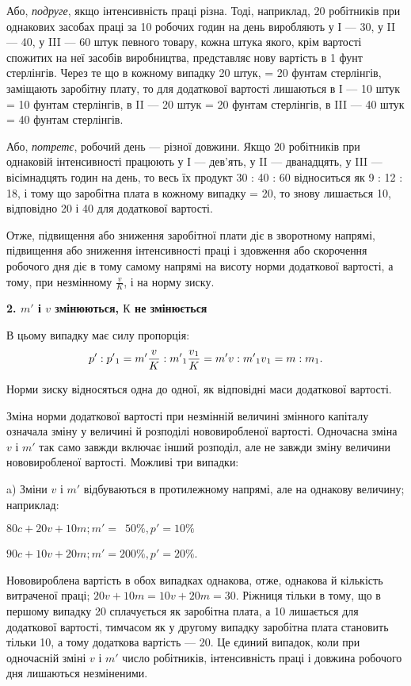 Або, \emph{подруге}, якщо інтенсивність праці різна. Тоді, наприклад,
20 робітників при однакових засобах праці за 10 робочих
годин на день виробляють у І — 30, у II — 40, у III — 60 штук
певного товару, кожна штука якого, крім вартості спожитих
на неї засобів виробництва, представляє нову вартість в 1 фунт
стерлінгів. Через те що в кожному випадку 20 штук, = 20
фунтам стерлінгів, заміщають заробітну плату, то для додаткової
вартості лишаються в І — 10 штук = 10 фунтам стерлінгів,
в II — 20 штук = 20 фунтам стерлінгів, в III — 40 штук = 40 фунтам
стерлінгів.

Або, \emph{потретє}, робочий день — різної довжини. Якщо 20 робітників
при однаковій інтенсивності працюють у І — дев’ять,
у II — дванадцять, у III — вісімнадцять годин на день, то весь їх
продукт 30 : 40 : 60 відноситься як 9 : 12 : 18, і тому що заробітна
плата в кожному випадку = 20, то знову лишається 10, відповідно
20 і 40 для додаткової вартості.

Отже, підвищення або зниження заробітної плати діє в зворотному
напрямі, підвищення або зниження інтенсивності праці
і здовження або скорочення робочого дня діє в тому самому
напрямі на висоту норми додаткової вартості, а тому, при незмінному
$\frac{v}{K}$, і на норму зиску.

\begin{center}
\textbf{2. $m'$ і $v$ змінюються, $К$ не змінюється}
\end{center}
В цьому випадку має силу пропорція:\[
p': p'\textsubscript{1} = m' \frac{v}{K} : m'\textsubscript{1} \frac{v\textsubscript{1}}{K} = m'v : m'\textsubscript{1}v\textsubscript{1} = m : m\textsubscript{1}.\]

Норми зиску відносяться одна до одної, як відповідні маси
додаткової вартості.

Зміна норми додаткової вартості при незмінній величині змінного
капіталу означала зміну у величині й розподілі нововиробленої
вартості. Одночасна зміна $v$ і $m'$ так само завжди включає
інший розподіл, але не завжди зміну величини нововиробленої
вартості. Можливі три випадки:

a) Зміни $v$ і $m'$ відбуваються в протилежному напрямі, але
на однакову величину; наприклад:
\begin{center}
$80 c + 20 v + 10 m; m' = \phantom{0}50\%, p' = 10\%$

$90 c + 10 v + 20 m; m' = 200\%, p' = 20\%$.
\end{center}
Нововироблена вартість в обох випадках однакова, отже, однакова
й кількість витраченої праці; $20 v + 10 m = 10 v + 20 m = 30$.
Ріжниця тільки в тому, що в першому випадку 20 сплачується
як заробітна плата, а 10 лишається для додаткової вартості,
тимчасом як у другому випадку заробітна плата становить
тільки 10, а тому додаткова вартість — 20. Це єдиний випадок,
коли при одночасній зміні $v$ і $m'$ число робітників, інтенсивність
праці і довжина робочого дня лишаються незміненими.

